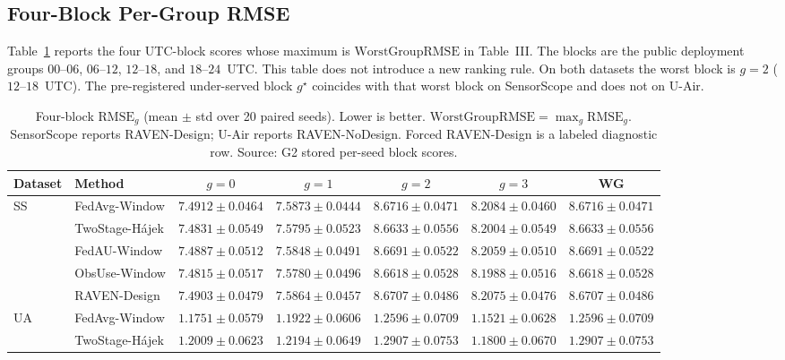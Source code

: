 \subsection{Four-Block Per-Group RMSE}
\label{app:block_rmse}

Table~\ref{tab:app_block_rmse} reports the four UTC-block scores whose
maximum is $\mathrm{WorstGroupRMSE}$ in
Table~III.  The blocks are the public
deployment groups $00$--$06$, $06$--$12$, $12$--$18$, and $18$--$24$~UTC.
This table does not introduce a new ranking rule.  On both datasets the
worst block is $g=2$ ($12$--$18$~UTC).  The pre-registered under-served
block $g^{\star}$ coincides with that worst block on SensorScope and
does not on U-Air.

\begin{table}[t]
\centering
\caption{Four-block $\mathrm{RMSE}_g$ (mean $\pm$ std over 20 paired
seeds).  Lower is better.  $\mathrm{WorstGroupRMSE}=\max_g\mathrm{RMSE}_g$.
SensorScope reports RAVEN-Design; U-Air reports RAVEN-NoDesign.  Forced RAVEN-Design is a labeled
diagnostic row.  Source: G2 stored per-seed block scores.}
\label{tab:app_block_rmse}
\footnotesize
\setlength{\tabcolsep}{4pt}
\begin{tabular*}{\textwidth}{@{\extracolsep{\fill}}llccccc}
\toprule
Dataset & Method & $g{=}0$ & $g{=}1$ & $g{=}2$ & $g{=}3$ & WG\\
\midrule
\multirow{5}{*}{SS}
& FedAvg-Window & $7.4912{\pm}0.0464$ & $7.5873{\pm}0.0444$ & $8.6716{\pm}0.0471$ & $8.2084{\pm}0.0460$ & $8.6716{\pm}0.0471$\\
& TwoStage-H\'ajek & $7.4831{\pm}0.0549$ & $7.5795{\pm}0.0523$ & $8.6633{\pm}0.0556$ & $8.2004{\pm}0.0549$ & $8.6633{\pm}0.0556$\\
& FedAU-Window & $7.4887{\pm}0.0512$ & $7.5848{\pm}0.0491$ & $8.6691{\pm}0.0522$ & $8.2059{\pm}0.0510$ & $8.6691{\pm}0.0522$\\
& ObsUse-Window & $7.4815{\pm}0.0517$ & $7.5780{\pm}0.0496$ & $8.6618{\pm}0.0528$ & $8.1988{\pm}0.0516$ & $8.6618{\pm}0.0528$\\
& RAVEN-Design & $7.4903{\pm}0.0479$ & $7.5864{\pm}0.0457$ & $8.6707{\pm}0.0486$ & $8.2075{\pm}0.0476$ & $8.6707{\pm}0.0486$\\
\midrule
\multirow{6}{*}{UA}
& FedAvg-Window & $1.1751{\pm}0.0579$ & $1.1922{\pm}0.0606$ & $1.2596{\pm}0.0709$ & $1.1521{\pm}0.0628$ & $1.2596{\pm}0.0709$\\
& TwoStage-H\'ajek & $1.2009{\pm}0.0623$ & $1.2194{\pm}0.0649$ & $1.2907{\pm}0.0753$ & $1.1800{\pm}0.0670$ & $1.2907{\pm}0.0753$\\

\end{tabular*}
\end{table}

